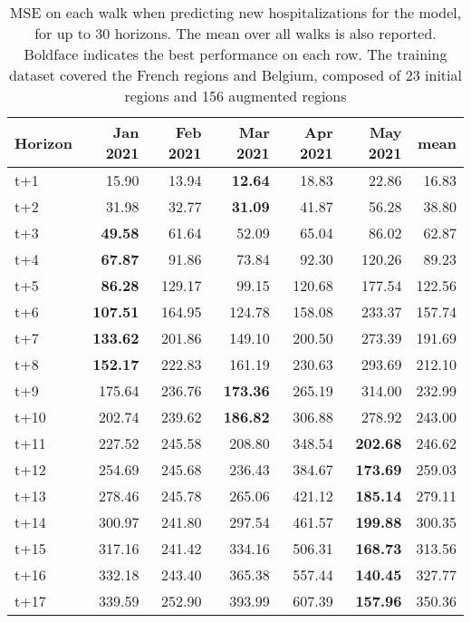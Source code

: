\begin{table}[H]
\centering
\caption{MSE on each walk when predicting new hospitalizations for the model, for up to 30 horizons. The mean over all walks is also reported. Boldface indicates the best performance on each row. The training dataset covered the French regions and Belgium, composed of 23 initial regions and 156 augmented regions }
\label{tab:MSE_walk_baseline}
\begin{tabular}{lrrrrrr}
\toprule
Horizon &  Jan 2021 &  Feb 2021 &  Mar 2021 &  Apr 2021 &  May 2021 &   mean \\
\midrule
t+1  & 15.90  & 13.94  & \textbf{12.64}  & 18.83  & 22.86  & 16.83  \\
t+2  & 31.98  & 32.77  & \textbf{31.09}  & 41.87  & 56.28  & 38.80  \\
t+3  & \textbf{49.58}  & 61.64  & 52.09  & 65.04  & 86.02  & 62.87  \\
t+4  & \textbf{67.87}  & 91.86  & 73.84  & 92.30  & 120.26  & 89.23  \\
t+5  & \textbf{86.28}  & 129.17  & 99.15  & 120.68  & 177.54  & 122.56  \\
t+6  & \textbf{107.51}  & 164.95  & 124.78  & 158.08  & 233.37  & 157.74  \\
t+7  & \textbf{133.62}  & 201.86  & 149.10  & 200.50  & 273.39  & 191.69  \\
t+8  & \textbf{152.17}  & 222.83  & 161.19  & 230.63  & 293.69  & 212.10  \\
t+9  & 175.64  & 236.76  & \textbf{173.36}  & 265.19  & 314.00  & 232.99  \\
t+10  & 202.74  & 239.62  & \textbf{186.82}  & 306.88  & 278.92  & 243.00  \\
t+11  & 227.52  & 245.58  & 208.80  & 348.54  & \textbf{202.68}  & 246.62  \\
t+12  & 254.69  & 245.68  & 236.43  & 384.67  & \textbf{173.69}  & 259.03  \\
t+13  & 278.46  & 245.78  & 265.06  & 421.12  & \textbf{185.14}  & 279.11  \\
t+14  & 300.97  & 241.80  & 297.54  & 461.57  & \textbf{199.88}  & 300.35  \\
t+15  & 317.16  & 241.42  & 334.16  & 506.31  & \textbf{168.73}  & 313.56  \\
t+16  & 332.18  & 243.40  & 365.38  & 557.44  & \textbf{140.45}  & 327.77  \\
t+17  & 339.59  & 252.90  & 393.99  & 607.39  & \textbf{157.96}  & 350.36  \\

\end{tabular}
\end{table}
